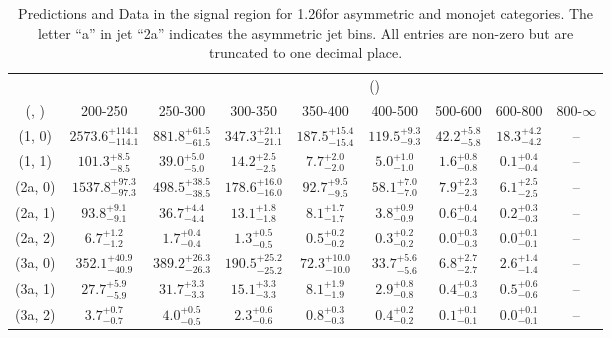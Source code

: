 \begin{table}[h!]
\tiny
\centering
\caption{Predictions and Data in the signal region for 1.26\ifb for asymmetric and monojet categories. The letter ``a'' in jet \eg ``2a''  indicates the asymmetric jet bins. All entries are non-zero but are truncated to one decimal place.\label{tab:yieldsseppost_sig_zinv_asym}}
\begin{tabular}
{ccccccccc}
	\hline\hline
&	& \multicolumn{8}{c}{\scalht (\gev)} \\ 
	 (\njet,  \nb) & 200-250 & 250-300 & 300-350 & 350-400 & 400-500 & 500-600 & 600-800 & 800-$\infty$ \\ [0.8ex] 
\hline
	(1, 0) & $2573.6^{+ 114.1 }_{- 114.1 }$ & $881.8^{+ 61.5 }_{- 61.5 }$ & $347.3^{+ 21.1 }_{- 21.1 }$ & $187.5^{+ 15.4 }_{- 15.4 }$ & $119.5^{+ 9.3 }_{- 9.3 }$ & $42.2^{+ 5.8 }_{- 5.8 }$ & $18.3^{+ 4.2 }_{- 4.2 }$ & -- \\[0.5ex] 
	(1, 1) & $101.3^{+ 8.5 }_{- 8.5 }$ & $39.0^{+ 5.0 }_{- 5.0 }$ & $14.2^{+ 2.5 }_{- 2.5 }$ & $7.7^{+ 2.0 }_{- 2.0 }$ & $5.0^{+ 1.0 }_{- 1.0 }$ & $1.6^{+ 0.8 }_{- 0.8 }$ & $0.1^{+ 0.4 }_{- 0.4 }$ & -- \\[0.5ex] 
	(2a, 0) & $1537.8^{+ 97.3 }_{- 97.3 }$ & $498.5^{+ 38.5 }_{- 38.5 }$ & $178.6^{+ 16.0 }_{- 16.0 }$ & $92.7^{+ 9.5 }_{- 9.5 }$ & $58.1^{+ 7.0 }_{- 7.0 }$ & $7.9^{+ 2.3 }_{- 2.3 }$ & $6.1^{+ 2.5 }_{- 2.5 }$ & -- \\[0.5ex] 
	(2a, 1) & $93.8^{+ 9.1 }_{- 9.1 }$ & $36.7^{+ 4.4 }_{- 4.4 }$ & $13.1^{+ 1.8 }_{- 1.8 }$ & $8.1^{+ 1.7 }_{- 1.7 }$ & $3.8^{+ 0.9 }_{- 0.9 }$ & $0.6^{+ 0.4 }_{- 0.4 }$ & $0.2^{+ 0.3 }_{- 0.3 }$ & -- \\[0.5ex] 
	(2a, 2) & $6.7^{+ 1.2 }_{- 1.2 }$ & $1.7^{+ 0.4 }_{- 0.4 }$ & $1.3^{+ 0.5 }_{- 0.5 }$ & $0.5^{+ 0.2 }_{- 0.2 }$ & $0.3^{+ 0.2 }_{- 0.2 }$ & $0.0^{+ 0.3 }_{- 0.3 }$ & $0.0^{+ 0.1 }_{- 0.1 }$ & -- \\[0.5ex] 
	(3a, 0) & $352.1^{+ 40.9 }_{- 40.9 }$ & $389.2^{+ 26.3 }_{- 26.3 }$ & $190.5^{+ 25.2 }_{- 25.2 }$ & $72.3^{+ 10.0 }_{- 10.0 }$ & $33.7^{+ 5.6 }_{- 5.6 }$ & $6.8^{+ 2.7 }_{- 2.7 }$ & $2.6^{+ 1.4 }_{- 1.4 }$ & -- \\[0.5ex] 
	(3a, 1) & $27.7^{+ 5.9 }_{- 5.9 }$ & $31.7^{+ 3.3 }_{- 3.3 }$ & $15.1^{+ 3.3 }_{- 3.3 }$ & $8.1^{+ 1.9 }_{- 1.9 }$ & $2.9^{+ 0.8 }_{- 0.8 }$ & $0.4^{+ 0.3 }_{- 0.3 }$ & $0.5^{+ 0.6 }_{- 0.6 }$ & -- \\[0.5ex] 
	(3a, 2) & $3.7^{+ 0.7 }_{- 0.7 }$ & $4.0^{+ 0.5 }_{- 0.5 }$ & $2.3^{+ 0.6 }_{- 0.6 }$ & $0.8^{+ 0.3 }_{- 0.3 }$ & $0.4^{+ 0.2 }_{- 0.2 }$ & $0.1^{+ 0.1 }_{- 0.1 }$ & $0.0^{+ 0.1 }_{- 0.1 }$ & -- \\[0.5ex] 

\end{tabular}
\end{table}

